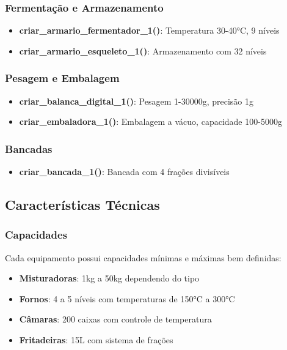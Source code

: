 \documentclass[11pt,a4paper]{article}
\begin{document}
\subsubsection{Fermentação e Armazenamento}

\begin{itemize}[leftmargin=2cm]
    \item \textbf{criar\_armario\_fermentador\_1()}: Temperatura 30-40°C, 9 níveis
    \item \textbf{criar\_armario\_esqueleto\_1()}: Armazenamento com 32 níveis
\end{itemize}

\subsubsection{Pesagem e Embalagem}

\begin{itemize}[leftmargin=2cm]
    \item \textbf{criar\_balanca\_digital\_1()}: Pesagem 1-30000g, precisão 1g
    \item \textbf{criar\_embaladora\_1()}: Embalagem a vácuo, capacidade 100-5000g
\end{itemize}

\subsubsection{Bancadas}

\begin{itemize}[leftmargin=2cm]
    \item \textbf{criar\_bancada\_1()}: Bancada com 4 frações divisíveis
\end{itemize}

\subsection{Características Técnicas}

\subsubsection{Capacidades}

Cada equipamento possui capacidades mínimas e máximas bem definidas:

\begin{itemize}
    \item \textbf{Misturadoras}: 1kg a 50kg dependendo do tipo
    \item \textbf{Fornos}: 4 a 5 níveis com temperaturas de 150°C a 300°C
    \item \textbf{Câmaras}: 200 caixas com controle de temperatura
    \item \textbf{Fritadeiras}: 15L com sistema de frações
\end{itemize}
\end{document}
